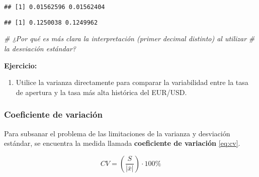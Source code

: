 \documentclass[
]{book}
\newenvironment{Shaded}{\begin{snugshade}}{\end{snugshade}}
\newcommand{\CommentTok}[1]{\textcolor[rgb]{0.56,0.35,0.01}{\textit{#1}}}
\newcommand{\FunctionTok}[1]{\textcolor[rgb]{0.00,0.00,0.00}{#1}}
\newcommand{\NormalTok}[1]{#1}
\newcommand{\SpecialCharTok}[1]{\textcolor[rgb]{0.00,0.00,0.00}{#1}}
\providecommand{\tightlist}{%
  \setlength{\itemsep}{0pt}\setlength{\parskip}{0pt}}
\begin{document}
\begin{verbatim}
## [1] 0.01562596 0.01562404
\end{verbatim}

\begin{Shaded}
\end{Shaded}

\begin{verbatim}
## [1] 0.1250038 0.1249962
\end{verbatim}

\begin{Shaded}
\begin{Highlighting}[]
\CommentTok{\# ¿Por qué es más clara la interpretación (primer decimal distinto) al utilizar}
\CommentTok{\# la desviación estándar?}
\end{Highlighting}
\end{Shaded}

\textbf{Ejercicio:}

\begin{enumerate}
\def\labelenumi{\arabic{enumi}.}
\tightlist
\item
  Utilice la varianza directamente para comparar la variabilidad entre la tasa de apertura y la tasa más alta histórica del EUR/USD.
\end{enumerate}

\hypertarget{coeficiente-de-variaciuxf3n}{%
\subsubsection*{Coeficiente de variación}\label{coeficiente-de-variaciuxf3n}}

Para subsanar el problema de las limitaciones de la varianza y desviación estándar, se encuentra la medida llamada \textbf{coeficiente de variación} \eqref{eq:cv}.

\begin{equation}
CV = \left(\frac{S}{|\bar{x}|}\right)\cdot 100\%
\label{eq:cv}
\end{equation}
\end{document}
